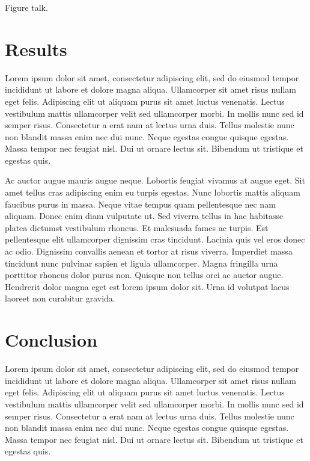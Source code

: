 \documentclass[letterpaper]{article} %
\begin{document}
\begin{NoHyper}
Figure talk.


\section{Results}
\label{sec:results}

Lorem ipsum dolor sit amet, consectetur adipiscing elit, sed do eiusmod tempor incididunt ut labore et dolore magna aliqua.
Ullamcorper sit amet risus nullam eget felis.
Adipiscing elit ut aliquam purus sit amet luctus venenatis.
Lectus vestibulum mattis ullamcorper velit sed ullamcorper morbi.
In mollis nunc sed id semper risus.
Consectetur a erat nam at lectus urna duis.
Tellus molestie nunc non blandit massa enim nec dui nunc.
Neque egestas congue quisque egestas.
Massa tempor nec feugiat nisl.
Dui ut ornare lectus sit.
Bibendum ut tristique et egestas quis.

Ac auctor augue mauris augue neque.
Lobortis feugiat vivamus at augue eget.
Sit amet tellus cras adipiscing enim eu turpis egestas.
Nunc lobortis mattis aliquam faucibus purus in massa.
Neque vitae tempus quam pellentesque nec nam aliquam.
Donec enim diam vulputate ut.
Sed viverra tellus in hac habitasse platea dictumst vestibulum rhoncus.
Et malesuada fames ac turpis.
Est pellentesque elit ullamcorper dignissim cras tincidunt.
Lacinia quis vel eros donec ac odio.
Dignissim convallis aenean et tortor at risus viverra.
Imperdiet massa tincidunt nunc pulvinar sapien et ligula ullamcorper.
Magna fringilla urna porttitor rhoncus dolor purus non.
Quisque non tellus orci ac auctor augue.
Hendrerit dolor magna eget est lorem ipsum dolor sit.
Urna id volutpat lacus laoreet non curabitur gravida.

\section{Conclusion}
\label{sec:conclusion}

Lorem ipsum dolor sit amet, consectetur adipiscing elit, sed do eiusmod tempor incididunt ut labore et dolore magna aliqua.
Ullamcorper sit amet risus nullam eget felis.
Adipiscing elit ut aliquam purus sit amet luctus venenatis.
Lectus vestibulum mattis ullamcorper velit sed ullamcorper morbi.
In mollis nunc sed id semper risus.
Consectetur a erat nam at lectus urna duis.
Tellus molestie nunc non blandit massa enim nec dui nunc.
Neque egestas congue quisque egestas.
Massa tempor nec feugiat nisl.
Dui ut ornare lectus sit.
Bibendum ut tristique et egestas quis.


\end{NoHyper}
\end{document}
